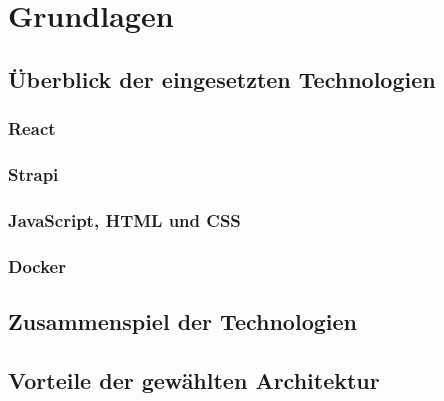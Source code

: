 \newpage

\section{Grundlagen} \label{grundlagen}

\subsection{Überblick der eingesetzten Technologien} \label{eingestzeTechnologien}
\subsubsection{React} \label{react}

\subsubsection{Strapi} \label{strapi}

\subsubsection{JavaScript, HTML und CSS} \label{javaHtmlCss}

\subsubsection{Docker} \label{docker}


\subsection{Zusammenspiel der Technologien} \label{zusammenspiel}

\subsection{Vorteile der gewählten Architektur} \label{vorteile}


